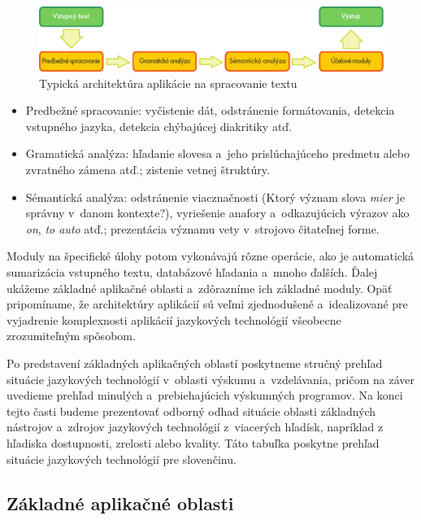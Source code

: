 \begin{multicols}{2}
\begin{figure}[hb]
  \center
  \includegraphics[width=\textwidth]{../_media/slovak/text_processing_app_architecture}
  \caption{Typická architektúra aplikácie na spracovanie textu}
  \label{fig:textprocessingarch_sk}
\end{figure}

\begin{itemize}
\item Predbežné spracovanie: vyčistenie dát, odstránenie formátovania, detekcia vstupného jazyka, detekcia chýbajúcej diakritiky atď.
\item Gramatická analýza: hľadanie slovesa a~jeho prislúchajúceho predmetu alebo zvratného zámena atď.; zistenie vetnej štruktúry.
\item Sémantická analýza: odstránenie viacznačnosti (Ktorý význam slova \emph{mier} je správny v~danom kontexte?), vyriešenie anafory a~odkazujúcich výrazov ako \emph{on}, \emph{to auto} atď.; prezentácia významu vety v~strojovo čitateľnej forme.	
\end{itemize}

Moduly na špecifické úlohy potom vykonávajú rôzne operácie, ako je
automatická sumarizácia vstupného textu, databázové hľadania
a~mnoho ďalších. Ďalej ukážeme základné aplikačné oblasti
a~zdôrazníme ich základné moduly. Opäť pripomíname,
že architektúry aplikácií sú veľmi zjednodušené a~idealizované
pre vyjadrenie komplexnosti aplikácií jazykových technológií
všeobecne zrozumiteľným spôsobom.

Po predstavení základných aplikačných oblastí poskytneme stručný
prehľad situácie jazykových technológií v~oblasti výskumu a~vzdelávania, pričom na záver uvedieme prehľad minulých
a~prebiehajúcich výskumných programov. Na konci tejto časti budeme
prezentovať odborný odhad situácie oblasti základných nástrojov
a~zdrojov jazykových technológií z~viacerých hľadísk, napríklad z hľadiska dostupnosti, zrelosti alebo kvality. Táto tabuľka poskytne
prehľad situácie jazykových technológií pre slovenčinu.

\subsection{Základné aplikačné oblasti}

\end{multicols}
